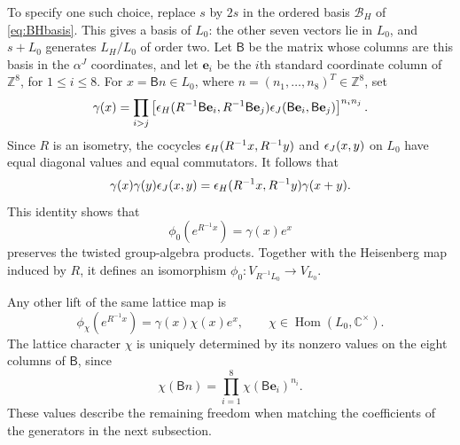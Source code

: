 \documentclass[11pt,reqno]{amsart}
\theoremstyle{definition}\newtheorem{definition}[theorem]{Definition}
\theoremstyle{remark}\newtheorem{remark}[theorem]{Remark}
\newcommand{\C}{\mathbb C}\newcommand{\Z}{\mathbb Z}\newcommand{\Q}{\mathbb Q}
\numberwithin{equation}{section}
\begin{document}
To specify one such choice, replace $s$ by $2s$ in the ordered basis $\mathcal B_H$ of \eqref{eq:BHbasis}. This gives a basis of $L_0$: the other seven vectors lie in $L_0$, and $s+L_0$ generates $L_H/L_0$ of order two. Let $\mathsf B$ be the matrix whose columns are this basis in the $\alpha^J$ coordinates, and let $\mathbf e_i$ be the $i$th standard coordinate column of $\Z^8$, for $1\le i\le8$. For $x=\mathsf Bn\in L_0$, where $n=(n_1,\ldots,n_8)^T\in\Z^8$, set
\begin{equation}\label{eq:gamma}
 \gamma(x)=\prod_{i>j}
 \left[\epsilon_H(R^{-1}\mathsf B\mathbf e_i,R^{-1}\mathsf B\mathbf e_j)
              \epsilon_J(\mathsf B\mathbf e_i,\mathsf B\mathbf e_j)\right]^{n_i n_j}.
\end{equation}
Since $R$ is an isometry, the cocycles $\epsilon_H(R^{-1}x,R^{-1}y)$ and $\epsilon_J(x,y)$ on $L_0$ have equal diagonal values and equal commutators. It follows that
\begin{equation}\label{eq:liftidentity}
 \gamma(x)\gamma(y)\epsilon_J(x,y)
 =\epsilon_H(R^{-1}x,R^{-1}y)\gamma(x+y).
\end{equation}
This identity shows that
\[
 \phi_0(e^{R^{-1}x})=\gamma(x)e^x
\]
preserves the twisted group-algebra products. Together with the Heisenberg map induced by $R$, it defines an isomorphism $\phi_0:V_{R^{-1}L_0}\longrightarrow V_{L_0}$.

Any other lift of the same lattice map is
\begin{equation}\label{eq:alllifts}
 \phi_\chi(e^{R^{-1}x})=\gamma(x)\chi(x)e^x,
 \qquad\chi\in\operatorname{Hom}(L_0,\C^\times).
\end{equation}
The lattice character $\chi$ is uniquely determined by its nonzero values on the eight columns of $\mathsf B$, since
\[
 \chi(\mathsf Bn)=\prod_{i=1}^8\chi(\mathsf B\mathbf e_i)^{n_i}.
\]
These values describe the remaining freedom when matching the coefficients of the generators in the next subsection.
\par\endgroup
\end{document}
